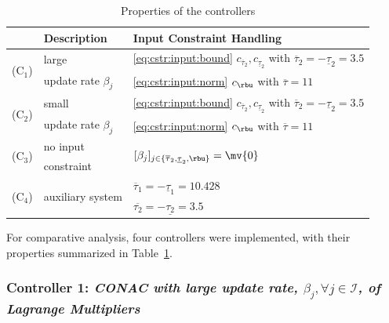 \documentclass[journal]{IEEEtran}
\begin{document}
\begin{table}[t]
    \renewcommand{\arraystretch}{1.3}
    \caption{Properties of the controllers}
    \label{table:controller}
    \centering
    \begin{tabular}{c l l}
    \hline
        &\bf{Description}&\bf{Input Constraint Handling}\\
    \hline
    \hline
        \multirow{2}{*}{(C$_1$)}&large&\eqref{eq:cstr:input:bound} $c_{\overline\tau_2}, c_{\underline\tau_2}$ with $\overline{\tau}_2=-\underline{\tau}_2=3.5$ \\
        &  update rate $\beta_j$ &\eqref{eq:cstr:input:norm} $c_{\rbu}$ with $\overline{\tau}=11$ \\
    \hline
        \multirow{2}{*}{(C$_2$)}&small&\eqref{eq:cstr:input:bound} $c_{\overline\tau_2}, c_{\underline\tau_2}$ with $\overline{\tau}_2=-\underline{\tau}_2=3.5$ \\
        &  update rate $\beta_j$ &\eqref{eq:cstr:input:norm} $c_{\rbu}$ with $\overline{\tau}=11$ \\
    \hline
        \multirow{2}{*}{(C$_3$)}&no input& \multirow{2}{*}{$[\beta_j]_{j\in\{\overline{\tau}_2,\underline{\tau}_2,\rbu\}}=\mv{0}$} \\
        & constraint &  \\
    \hline
        \multirow{2}{*}{(C$_4$)}&\multirow{2}{*}{auxiliary system} & $\overline{\tau}_1=-\underline{\tau}_1=10.428$ \\
        &  & $\overline{\tau_2}=-\underline{\tau_2}=3.5$ \\    
    \hline
    \end{tabular}
    \label{table:controllers}
\end{table}


\hfill

For comparative analysis, four controllers were implemented, with their properties summarized in Table~\ref{table:controllers}.

\subsubsection*{Controller 1:  \textit{CONAC with large update rate, $\beta_j,\forall j\in\mathcal{I}$, of Lagrange Multipliers}}
\end{document}
